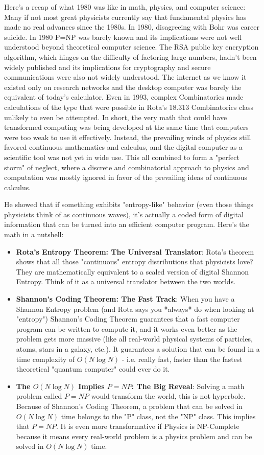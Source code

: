 \documentclass{report}
\begin{document}
Here's a recap of what 1980 was like in math, physics, and computer science:
Many if not most great physicists currently say that fundamental physics has made no real advances since the 1980s. In 1980, disagreeing with Bohr was career suicide. In 1980 P=NP was barely known and its implications were not well understood beyond theoretical computer science. The RSA public key encryption algorithm, which hinges on the difficulty of factoring large numbers, hadn't been widely published and its implications for cryptography and secure communications were also not widely understood. The internet as we know it existed only on research networks and the desktop computer was barely the equivalent of today's calculator. Even in 1993, complex Combinatorics made calculations of the type that were possible in Rota's 18.313 Combinatorics class unlikely to even be attempted. In short, the very math that could have transformed computing was being developed at the same time that computers were too weak to use it effectively. Instead, the prevailing winds of physics still favored continuous mathematics and calculus, and the digital computer as a scientific tool was not yet in wide use. This all combined to form a "perfect storm" of neglect, where a discrete and combinatorial approach to physics and computation was mostly ignored in favor of the prevailing ideas of continuous calculus.

He showed that if something exhibits "entropy-like" behavior (even those things physicists think of as continuous waves), it's actually a coded form of digital information that can be turned into an efficient computer program. Here's the math in a nutshell:

\begin{itemize}
    \item \textbf{Rota's Entropy Theorem: The Universal Translator}: Rota's theorem shows that all those "continuous" entropy distributions that physicists love? They are mathematically equivalent to a scaled version of digital Shannon Entropy. Think of it as a universal translator between the two worlds.
    \item \textbf{Shannon's Coding Theorem: The Fast Track}: When you have a Shannon Entropy problem (and Rota says you *always* do when looking at "entropy") Shannon's Coding Theorem guarantees that a fast computer program can be written to compute it, and it works even better as the problem gets more massive (like all real-world physical systems of particles, atoms, stars in a galaxy, etc.). It guarantees a solution that can be found in a time complexity of \(O(N \log N)\) - i.e. really fast, faster than the fastest theoretical "quantum computer" could ever do it.
    \item \textbf{The \(O(N \log N)\) Implies \(P=NP\): The Big Reveal}: Solving a math problem called $P=NP$ would transform the world, this is not hyperbole. Because of Shannon's Coding Theorem, a problem that can be solved in \(O(N \log N)\) time belongs to the "P" class, not the "NP" class. This implies that \(P=NP\). It is even more transformative if Physics is NP-Complete because it means every real-world problem is a physics problem and can be solved in \(O(N \log N)\) time.
\end{itemize}
\end{document}
